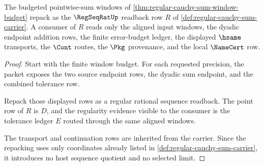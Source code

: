 \begin{theorem}
\label{thm:regular-cauchy-sum-regseqrat-handoff}
The budgeted pointwise-sum windows of \autoref{thm:regular-cauchy-sum-window-budget} repack as the $\RegSeqRatUp$ readback row $R$ of \autoref{def:regular-cauchy-sum-carrier}. A consumer of $R$ reads only the aligned input windows, the dyadic endpoint addition rows, the finite error-budget ledger, the displayed $\hsame$ transports, the $\Cont$ routes, the $\Pkg$ provenance, and the local $\NameCert$ row.
\end{theorem}
\begin{proof}
Start with the finite window budget. For each requested precision, the packet exposes the two source endpoint rows, the dyadic sum endpoint, and the combined tolerance row.

Repack those displayed rows as a regular rational sequence readback. The point row of $R$ is $D$, and the regularity evidence visible to the consumer is the tolerance ledger $E$ routed through the same aligned windows.

The transport and continuation rows are inherited from the carrier. Since the repacking uses only coordinates already listed in \autoref{def:regular-cauchy-sum-carrier}, it introduces no host sequence quotient and no selected limit.
\end{proof}

